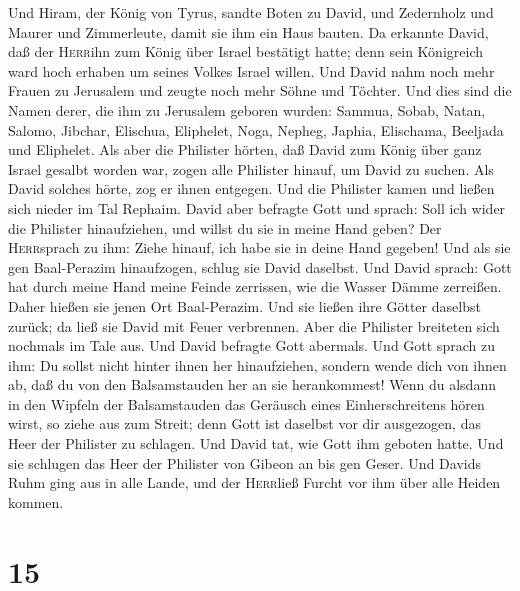  Und Hiram, der König von Tyrus, sandte Boten zu David,
und Zedernholz und Maurer und Zimmerleute, damit sie ihm ein Haus
bauten.  Da erkannte David, daß der \textsc{Herr}ihn zum
König über Israel bestätigt hatte; denn sein Königreich ward hoch
erhaben um seines Volkes Israel willen.  Und David nahm
noch mehr Frauen zu Jerusalem und zeugte noch mehr Söhne und Töchter.
 Und dies sind die Namen derer, die ihm zu Jerusalem
geboren wurden: Sammua, Sobab, Natan, Salomo,  Jibchar,
Elischua, Eliphelet,  Noga, Nepheg, Japhia, 
Elischama, Beeljada und Eliphelet.  Als aber die Philister
hörten, daß David zum König über ganz Israel gesalbt worden war, zogen
alle Philister hinauf, um David zu suchen. Als David solches hörte, zog
er ihnen entgegen.  Und die Philister kamen und ließen
sich nieder im Tal Rephaim.  David aber befragte Gott und
sprach: Soll ich wider die Philister hinaufziehen, und willst du sie in
meine Hand geben? Der \textsc{Herr}sprach zu ihm: Ziehe hinauf, ich habe
sie in deine Hand gegeben!  Und als sie gen Baal-Perazim
hinaufzogen, schlug sie David daselbst. Und David sprach: Gott hat durch
meine Hand meine Feinde zerrissen, wie die Wasser Dämme zerreißen. Daher
hießen sie jenen Ort Baal-Perazim.  Und sie ließen ihre
Götter daselbst zurück; da ließ sie David mit Feuer verbrennen.
 Aber die Philister breiteten sich nochmals im Tale aus.
 Und David befragte Gott abermals. Und Gott sprach zu
ihm: Du sollst nicht hinter ihnen her hinaufziehen, sondern wende dich
von ihnen ab, daß du von den Balsamstauden her an sie herankommest!
 Wenn du alsdann in den Wipfeln der Balsamstauden das
Geräusch eines Einherschreitens hören wirst, so ziehe aus zum Streit;
denn Gott ist daselbst vor dir ausgezogen, das Heer der Philister zu
schlagen.  Und David tat, wie Gott ihm geboten hatte. Und
sie schlugen das Heer der Philister von Gibeon an bis gen Geser.
 Und Davids Ruhm ging aus in alle Lande, und der
\textsc{Herr}ließ Furcht vor ihm über alle Heiden kommen.

\hypertarget{section-14}{%
\section{15}\label{section-14}}

